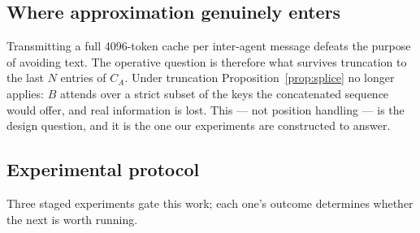 \documentclass[11pt]{article}
\begin{document}
\subsection{Where approximation genuinely enters}

Transmitting a full 4096-token cache per inter-agent message defeats the
purpose of avoiding text. The operative question is therefore what survives
truncation to the last $N$ entries of $C_A$. Under truncation
Proposition~\ref{prop:splice} no longer applies: $B$ attends over a strict
subset of the keys the concatenated sequence would offer, and real information
is lost. This --- not position handling --- is the design question, and it is
the one our experiments are constructed to answer.

\subsection{Experimental protocol}

Three staged experiments gate this work; each one's outcome determines whether
the next is worth running.
\end{document}
